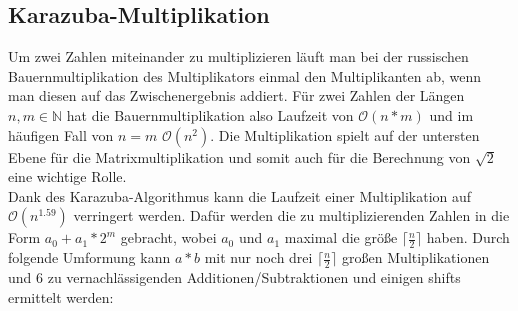 \documentclass[course=erap]{aspdoc}
\begin{document}
\subsection{Karazuba-Multiplikation}
Um zwei Zahlen miteinander zu multiplizieren läuft man bei der russischen Bauernmultiplikation des Multiplikators einmal den Multiplikanten ab, wenn man diesen auf das Zwischenergebnis addiert. 
Für zwei Zahlen der Längen $n, m \in\mathbb{N}$ hat die Bauernmultiplikation also Laufzeit von $\mathcal{O}(n*m)$ und im häufigen Fall von $n=m$ $\mathcal{O}(n^2)$.
Die Multiplikation spielt auf der untersten Ebene für die Matrixmultiplikation und somit auch für die Berechnung von $\sqrt{2}$ eine wichtige Rolle.\\
Dank des Karazuba-Algorithmus kann die Laufzeit einer Multiplikation auf $\mathcal{O}(n^{1.59})$ verringert werden.
Dafür werden die zu multiplizierenden Zahlen in die Form $a_0+a_1*2^m$ gebracht, wobei $a_0$ und $a_1$ maximal die größe $\lceil\frac{n}{2}\rceil$ haben.
Durch folgende Umformung kann $a*b$ mit nur noch drei $\lceil\frac{n}{2}\rceil$ großen Multiplikationen und 6 zu vernachlässigenden Additionen/Subtraktionen und einigen shifts ermittelt werden:
\end{document}
